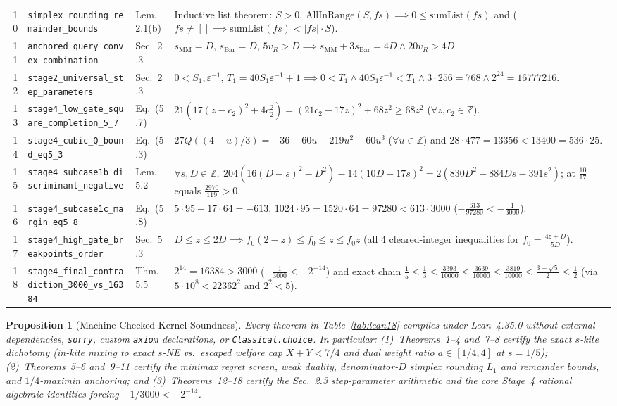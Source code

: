 \documentclass[10pt,twocolumn]{article}
\newtheorem{proposition}{Proposition}
\newcommand{\ZZ}{\mathbb{Z}}
\begin{document}
\begin{table}[t]
\begin{tabular}{@{}r l l p{10.5cm}@{}}
10 & \texttt{simplex\_rounding\_remainder\_bounds} & Lem.~2.1(b) & Inductive list theorem: $S>0,\,\mathrm{AllInRange}(S,fs)\implies 0\le \mathrm{sumList}(fs)$ and ($fs\ne [] \implies \mathrm{sumList}(fs)<|fs|\cdot S$). \\
11 & \texttt{anchored\_query\_convex\_combination} & Sec.~2.3 & $s_{\mathrm{MM}}=D,\,s_{\mathrm{Bar}}=D,\,5v_R>D \implies s_{\mathrm{MM}}+3 s_{\mathrm{Bar}}=4D \wedge 20 v_R > 4D$. \\
12 & \texttt{stage2\_universal\_step\_parameters} & Sec.~2.3 & $0<S_1,\varepsilon^{-1}$, $T_1=40 S_1\varepsilon^{-1}{+}1 \implies 0<T_1 \wedge 40 S_1\varepsilon^{-1}<T_1 \wedge 3\cdot 256=768 \wedge 2^{24}=16777216$. \\
13 & \texttt{stage4\_low\_gate\_square\_completion\_5\_7} & Eq.~(5.7) & $21(17(z{-}c_2)^2 + 4 c_2^2) = (21 c_2{-}17 z)^2 + 68 z^2 \ge 68 z^2$ ($\forall z,c_2\in\ZZ$). \\
14 & \texttt{stage4\_cubic\_Q\_bound\_eq5\_3} & Eq.~(5.3) & $27 Q((4{+}u)/3) = -36 - 60u - 219u^2 - 60u^3$ ($\forall u\in\ZZ$) and $28\cdot 477 = 13356 < 13400 = 536\cdot 25$. \\
15 & \texttt{stage4\_subcase1b\_discriminant\_negative} & Lem.~5.2 & $\forall s,D\in\ZZ,\ 204(16(D{-}s)^2{-}D^2)-14(10D{-}17s)^2 = 2(830 D^2{-}884 Ds{-}391 s^2)$; at $\frac{10}{17}$ equals $\frac{2970}{119}>0$. \\
16 & \texttt{stage4\_subcase1c\_margin\_eq5\_8} & Eq.~(5.8) & $5\cdot 95 - 17\cdot 64 = -613$, $1024\cdot 95 = 1520\cdot 64 = 97280 < 613\cdot 3000$ ($-\frac{613}{97280} < -\frac{1}{3000}$). \\
17 & \texttt{stage4\_high\_gate\_breakpoints\_order} & Sec.~5.3 & $D\le z\le 2D \implies f_0(2{-}z)\le f_0 \le z \le f_0 z$ (all 4 cleared-integer inequalities for $f_0=\frac{4z+D}{5D}$). \\
18 & \texttt{stage4\_final\_contradiction\_3000\_vs\_16384} & Thm.~5.5 & $2^{14}=16384>3000$ ($-\frac{1}{3000}<-2^{-14}$) and exact chain $\frac15 < \frac13 < \frac{3393}{10000} < \frac{3639}{10000} < \frac{3819}{10000} < \frac{3-\sqrt{5}}{2} < \frac12$ (via $5\cdot 10^8<22362^2$ and $2^2<5$). \\
\bottomrule
\end{tabular}
\end{table}

\begin{proposition}[Machine-Checked Kernel Soundness]\label{prop:lean}
\normalfont Every theorem in Table~\ref{tab:lean18} compiles under Lean~4.35.0 without external dependencies, \texttt{sorry}, custom \texttt{axiom} declarations, or \texttt{Classical.choice}. In particular: (1)~Theorems~1--4 and~7--8 certify the exact $s$-kite dichotomy (in-kite mixing to exact $s$-NE vs.\ escaped welfare cap $X+Y < 7/4$ and dual weight ratio $a\in[1/4,4]$ at $s=1/5$); (2)~Theorems~5--6 and~9--11 certify the minimax regret screen, weak duality, denominator-$D$ simplex rounding $L_1$ and remainder bounds, and $1/4$-maximin anchoring; and (3)~Theorems~12--18 certify the Sec.~2.3 step-parameter arithmetic and the core Stage~4 rational algebraic identities forcing $-1/3000 < -2^{-14}$.
\end{proposition}
\end{document}
